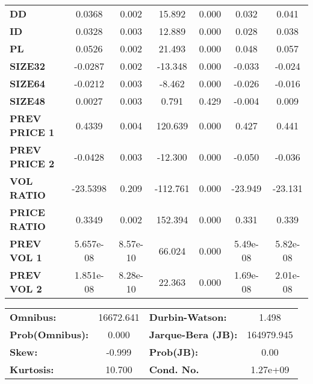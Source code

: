 \documentclass{article}
\begin{document}
\begin{center}
\begin{tabular}{lcccccc}
\textbf{DD}    &       0.0368  &        0.002     &    15.892  &         0.000        &        0.032    &        0.041     \\
\textbf{ID}    &       0.0328  &        0.003     &    12.889  &         0.000        &        0.028    &        0.038     \\
\textbf{PL}    &       0.0526  &        0.002     &    21.493  &         0.000        &        0.048    &        0.057     \\
\textbf{SIZE32}    &      -0.0287  &        0.002     &   -13.348  &         0.000        &       -0.033    &       -0.024     \\
\textbf{SIZE64}    &      -0.0212  &        0.003     &    -8.462  &         0.000        &       -0.026    &       -0.016     \\
\textbf{SIZE48}   &       0.0027  &        0.003     &     0.791  &         0.429        &       -0.004    &        0.009     \\
\textbf{PREV PRICE 1}   &       0.4339  &        0.004     &   120.639  &         0.000        &        0.427    &        0.441     \\
\textbf{PREV PRICE 2}   &      -0.0428  &        0.003     &   -12.300  &         0.000        &       -0.050    &       -0.036     \\
\textbf{VOL RATIO}   &     -23.5398  &        0.209     &  -112.761  &         0.000        &      -23.949    &      -23.131     \\
\textbf{PRICE RATIO}   &       0.3349  &        0.002     &   152.394  &         0.000        &        0.331    &        0.339     \\
\textbf{PREV VOL 1}   &    5.657e-08  &     8.57e-10     &    66.024  &         0.000        &     5.49e-08    &     5.82e-08     \\
\textbf{PREV VOL 2}   &    1.851e-08  &     8.28e-10     &    22.363  &         0.000        &     1.69e-08    &     2.01e-08     \\
\bottomrule
\end{tabular}
\begin{tabular}{lclc}
\textbf{Omnibus:}       & 16672.641 & \textbf{  Durbin-Watson:     } &     1.498   \\
\textbf{Prob(Omnibus):} &    0.000  & \textbf{  Jarque-Bera (JB):  } & 164979.945  \\
\textbf{Skew:}          &   -0.999  & \textbf{  Prob(JB):          } &      0.00   \\
\textbf{Kurtosis:}      &   10.700  & \textbf{  Cond. No.          } &  1.27e+09   \\
\bottomrule
\end{tabular}
\end{center}
\end{document}
